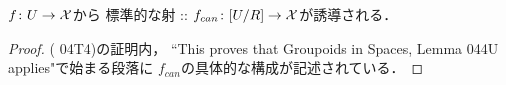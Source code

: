     \begin{Lemma}[\cite{SP} 04T4 (5)]
        $f \colon U \to \mathcal{X}$から
        標準的な射 :: $f_{can} \colon [U/R] \to \mathcal{X}$が誘導される．
    \end{Lemma}
    \begin{proof}
        (\cite{SP} 04T4)の証明内，
        ``This proves that Groupoids in Spaces, Lemma 044U applies"で始まる段落に
        $f_{can}$の具体的な構成が記述されている．
    \end{proof}

\printbibliography[title=参考文献]

